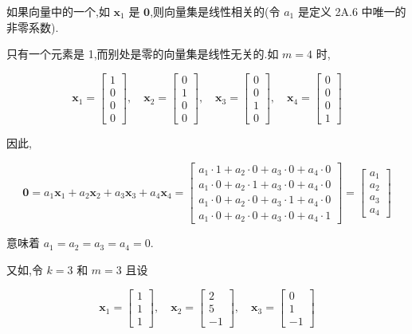 
如果向量中的一个,如 $\bm{x}_1$ 是 $\bm{0}$,则向量集是线性相关的(令 $a_1$ 是定义 2A.6 中唯一的非零系数).

只有一个元素是 1,而别处是零的向量集是线性无关的.如 $m=4$ 时,

\[
\bm{x}_1 = \begin{bmatrix} 1 \\ 0 \\ 0 \\ 0 \end{bmatrix}, \quad
\bm{x}_2 = \begin{bmatrix} 0 \\ 1 \\ 0 \\ 0 \end{bmatrix}, \quad
\bm{x}_3 = \begin{bmatrix} 0 \\ 0 \\ 1 \\ 0 \end{bmatrix}, \quad
\bm{x}_4 = \begin{bmatrix} 0 \\ 0 \\ 0 \\ 1 \end{bmatrix}
\]

因此,

\[
\bm{0} = a_1\bm{x}_1 + a_2\bm{x}_2 + a_3\bm{x}_3 + a_4\bm{x}_4
= \begin{bmatrix}
a_1 \cdot 1 + a_2 \cdot 0 + a_3 \cdot 0 + a_4 \cdot 0 \\
a_1 \cdot 0 + a_2 \cdot 1 + a_3 \cdot 0 + a_4 \cdot 0 \\
a_1 \cdot 0 + a_2 \cdot 0 + a_3 \cdot 1 + a_4 \cdot 0 \\
a_1 \cdot 0 + a_2 \cdot 0 + a_3 \cdot 0 + a_4 \cdot 1
\end{bmatrix}
= \begin{bmatrix} a_1 \\ a_2 \\ a_3 \\ a_4 \end{bmatrix}
\]

意味着 $a_1 = a_2 = a_3 = a_4 = 0$.

又如,令 $k=3$ 和 $m=3$ 且设

\[
\bm{x}_1 = \begin{bmatrix} 1 \\ 1 \\ 1 \end{bmatrix}, \quad
\bm{x}_2 = \begin{bmatrix} 2 \\ 5 \\ -1 \end{bmatrix}, \quad
\bm{x}_3 = \begin{bmatrix} 0 \\ 1 \\ -1 \end{bmatrix}
\]

